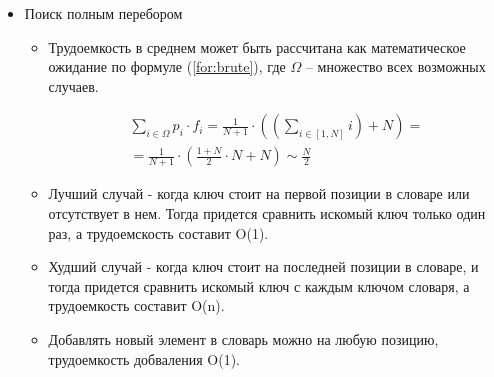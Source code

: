 \begin{itemize}
	\item Поиск полным перебором
	\begin{itemize}
		\item Трудоемкость в среднем может быть рассчитана как математическое ожидание по формуле (\ref{for:brute}), где $\Omega$ -- множество всех возможных случаев.
		
		\begin{equation}
			\label{for:brute}
			\begin{aligned}
				\sum\limits_{i \in \Omega} p_i \cdot f_i = \frac{1}{N + 1} \cdot ((\sum\limits_{i \in [1, N]}i) + N) = \\
				= \frac{1}{N + 1} \cdot (\frac{1 + N}{2} \cdot N + N) \sim \frac{N}{2}
			\end{aligned}
		\end{equation}
			
		
		\item Лучший случай - когда ключ стоит на первой позиции в словаре или отсутствует в нем. Тогда придется сравнить искомый ключ только один раз, а трудоемскость составит O(1).
		
		\item Худший случай - когда ключ стоит на последней позиции в словаре, и тогда придется сравнить искомый ключ с каждым ключом словаря, а трудоемкость составит O(n).
		
		\item Добавлять новый элемент в словарь можно на любую позицию, трудоемкость добваления O(1).

	\end{itemize}



\end{itemize}
